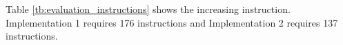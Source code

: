 Table \ref{tb:evaluation_instructions} shows the increasing instruction.
Implementation 1 requires 176 instructions and Implementation 2 requires 137
instructions.
%



  

  
